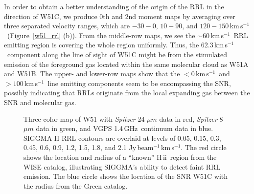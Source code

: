 \documentclass[manuscript]{aastex61}
\newcommand{\hii}{{\rm H\,}{{\sc ii}}}
\newcommand{\kms}{\,km\,s$^{-1}$}
\newcommand{\ghz}{\,GHz}
\newcommand{\um}{\mu m}
\begin{document}
In order to obtain a better understanding of the origin of the RRL in the direction of W51C, we produce 0th and 2nd moment maps by averaging over three separated velocity ranges, which are $-30-0$, $10-90$, and $120-150$\kms\ (Figure~\ref{w51_rrl} (b)).
From the middle-row maps, we see the $\sim60$\kms\ RRL emitting region is covering the whole region uniformly. 
Thus, the 62.3\kms\ component along the line of sight of W51C might be from the stimulated emission of the foreground gas located within the same molecular cloud as W51A and W51B.
The upper- and lower-row maps show that the $<0$\kms\ and $>100$\kms\ line emitting components seem to be encompassing the SNR, possibly indicating that RRLs originate from the local expanding gas between the SNR and molecular gas.

\begin{figure}[htbp]
\centering
{}
\caption{Three-color map of W51 
with {\it Spitzer} 24 $\um$ data in red,  {\it Spitzer} 8 $\um$ data in green, and VGPS 1.4\ghz\ continuum data in blue. 
SIGGMA H-RRL contours are overlaid at levels of 0.05, 0.15, 0.3, 0.45, 0.6, 0.9, 1.2, 1.5, 1.8, and 2.1 Jy\,beam$^{-1}$\kms. The red circle shows the location and radius of a ``known'' \hii\ region from the WISE catalog, illustrating SIGGMA's ability to detect faint RRL emission. The blue circle shows the location of the SNR W51C with the radius from the Green catalog.}\label{w51_map}
\end{figure}
\end{document}
